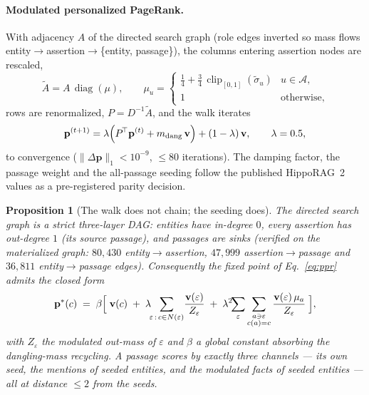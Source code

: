 \documentclass[11pt,a4paper]{article}
\newtheorem{proposition}{Proposition}
\newcommand{\hippo}{HippoRAG~2}
\newcommand{\op}[1]{\operatorname{#1}}
\begin{document}
\paragraph{Modulated personalized PageRank.} With adjacency $A$ of the
directed search graph (role edges inverted so mass flows
entity$\to$assertion$\to$\{entity, passage\}), the columns entering assertion
nodes are rescaled,
\begin{equation}
\tilde A=A\,\op{diag}(\mu),\qquad
\mu_u=\begin{cases}
\tfrac14+\tfrac34\,\op{clip}_{[0,1]}(\tilde\sigma_u) & u\in\mathcal A,\\
1 & \text{otherwise},
\end{cases}
\label{eq:modulation}
\end{equation}
rows are renormalized, $P=D^{-1}\tilde A$, and the walk iterates
\begin{equation}
\mathbf p^{(t+1)}=\lambda\Bigl(P^{\!\top}\mathbf p^{(t)}
+m_{\text{dang}}\,\mathbf v\Bigr)+(1-\lambda)\,\mathbf v,
\qquad \lambda=0.5,
\label{eq:ppr}
\end{equation}
to convergence ($\lVert\Delta\mathbf p\rVert_1<10^{-9}$, $\le 80$
iterations). The damping factor, the passage weight and the all-passage
seeding follow the published \hippo{} values as a pre-registered parity
decision.

\begin{proposition}[The walk does not chain; the seeding does]
\label{prop:closedform}
The directed search graph is a strict three-layer DAG:
entities have in-degree $0$, every assertion has out-degree $1$ (its source
passage), and passages are sinks (verified on the materialized graph:
$80{,}430$ entity$\to$assertion, $47{,}999$ assertion$\to$passage and
$36{,}811$ entity$\to$passage edges). Consequently the fixed point of
Eq.~\eqref{eq:ppr} admits the closed form
\begin{equation}
\mathbf p^{*}(c)\;=\;\beta\Bigl[\;\mathbf v(c)
\;+\;\lambda\!\!\sum_{\varepsilon\,:\,c\in N(\varepsilon)}\!\frac{\mathbf v(\varepsilon)}{Z_\varepsilon}
\;+\;\lambda^{2}\!\!\sum_{\varepsilon}\sum_{\substack{a\ni\varepsilon\\ c(a)=c}}
\frac{\mathbf v(\varepsilon)\,\mu_a}{Z_\varepsilon}\;\Bigr],
\label{eq:closedform}
\end{equation}
with $Z_\varepsilon$ the modulated out-mass of $\varepsilon$ and $\beta$ a
global constant absorbing the dangling-mass recycling. A passage scores by
exactly three channels --- its own seed, the mentions of seeded entities,
and the modulated facts of seeded entities --- all at distance $\le 2$ from
the seeds.
\end{proposition}
\end{document}
